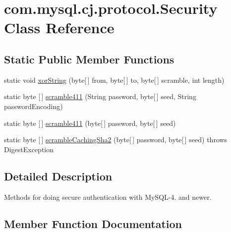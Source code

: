 \hypertarget{classcom_1_1mysql_1_1cj_1_1protocol_1_1_security}{}\section{com.\+mysql.\+cj.\+protocol.\+Security Class Reference}
\label{classcom_1_1mysql_1_1cj_1_1protocol_1_1_security}
\subsection*{Static Public Member Functions}
\begin{DoxyCompactItemize}
\item 
static void \mbox{\hyperlink{classcom_1_1mysql_1_1cj_1_1protocol_1_1_security_a6529697fb27ef62f6a21cb347f5e4c99}{xor\+String}} (byte\mbox{[}$\,$\mbox{]} from, byte\mbox{[}$\,$\mbox{]} to, byte\mbox{[}$\,$\mbox{]} scramble, int length)
\item 
static byte \mbox{[}$\,$\mbox{]} \mbox{\hyperlink{classcom_1_1mysql_1_1cj_1_1protocol_1_1_security_abe3782ad69fe2237705cbf44e28ab779}{scramble411}} (String password, byte\mbox{[}$\,$\mbox{]} seed, String password\+Encoding)
\item 
static byte \mbox{[}$\,$\mbox{]} \mbox{\hyperlink{classcom_1_1mysql_1_1cj_1_1protocol_1_1_security_a1459b1e2d3828790e1d8982e65e68b34}{scramble411}} (byte\mbox{[}$\,$\mbox{]} password, byte\mbox{[}$\,$\mbox{]} seed)
\item 
static byte \mbox{[}$\,$\mbox{]} \mbox{\hyperlink{classcom_1_1mysql_1_1cj_1_1protocol_1_1_security_a0f3d13ee7c5799791fe54f3857581bfd}{scramble\+Caching\+Sha2}} (byte\mbox{[}$\,$\mbox{]} password, byte\mbox{[}$\,$\mbox{]} seed)  throws Digest\+Exception 
\end{DoxyCompactItemize}


\subsection{Detailed Description}
Methods for doing secure authentication with My\+S\+Q\+L-\/4. and newer. 

\subsection{Member Function Documentation}
\mbox{\label{classcom_1_1mysql_1_1cj_1_1protocol_1_1_security_abe3782ad69fe2237705cbf44e28ab779}} 
